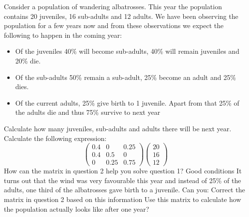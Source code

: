 \documentclass[a4paper]{report}
\begin{document}
\begin{Exercise}[label=alba,title=Population ecology and matrices, difficulty=1]
Consider a population of wandering albatrosses. This year the population contains 20 juveniles, 16 sub-adults and 12 adults. We have been observing the population for a few years now and from these observations we expect the following to happen in the coming year:
\begin{itemize}
\item Of the juveniles 40\% will become sub-adults, 40\% will remain juveniles and 20\% die.
\item Of the sub-adults 50\% remain a sub-adult, 25\% become an adult and 25\% dies.
\item Of the current adults, 25\% give birth to 1 juvenile. Apart from that 25\% of the adults die and thus 75\% survive to next year
\end{itemize}
\Question Calculate how many juveniles, sub-adults and adults there will be next year.
\Question Calculate the following expression:
\begin{equation*}
\begin{pmatrix}0.4&0&0.25\\0.4&0.5&0\\0&0.25&0.75\end{pmatrix}\begin{pmatrix}20\\16\\12\end{pmatrix}
\end{equation*}
\Question How can the matrix in question 2 help you solve question 1?
\Question Good conditions
It turns out that the wind was very favourable this year and instead of
25\% of the adults, one third of the albatrosses gave birth to a juvenile.
Can you:
\subQuestion Correct the matrix in question 2 based on this information
\subQuestion Use this matrix to calculate how the population actually looks like after one year?
\end{Exercise}
\end{document}
